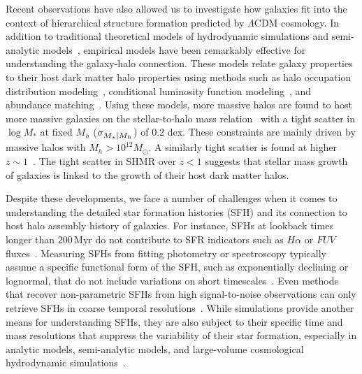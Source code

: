 \documentclass[12pt, letterpaper, preprint, tighten]{aastex62}
\newcommand{\siglogm}{\sigma_{\scaleto{M_*|M_h}{8pt}}}
\begin{document}
Recent observations have also allowed us to investigate how galaxies fit
into the context of hierarchical structure formation predicted by 
$\Lambda$CDM cosmology. In addition to traditional theoretical
models of hydrodynamic simulations and semi-analytic models~\citep[see][for reviews]{silk2012, somerville2015},
empirical models have been remarkably effective for understanding the 
galaxy-halo connection. These models relate galaxy properties to their 
host dark matter halo properties using methods such as halo occupation 
distribution modeling~\citep[HOD; \emph{e.g.}][]{zheng2007,zehavi2011,leauthaud2012,parejko2013,zu2015},
conditional luminosity function modeling~\citep[\emph{e.g.}][]{yang2009}, 
and abundance matching~\citep[\emph{e.g.}][]{kravtsov2004, vale2006, conroy2009, moster2013, reddick2013}.
Using these models, more massive halos are found to host more massive 
galaxies on the stellar-to-halo mass relation~\citep[hereafter SHMR;][]{mandelbaum2006a, conroy2007, more2011, leauthaud2012, tinker2013, velander2014, han2015, zu2015, gu2016, lange2018a} 
with a tight scatter in $\log M_*$ at fixed $M_h$ ($\siglogm$) of $0.2$ dex. 
These constraints are mainly driven by massive halos with $M_h > 10^{12} M_\odot$. 
A similarly tight scatter is found at higher $z\sim1$~\citep{leauthaud2012, tinker2013, patel2015}.
The tight scatter in SHMR over $z < 1$ suggests that stellar mass growth of 
galaxies is linked to the growth of their host dark matter halos.

Despite these developments, we face a number of challenges when it comes
to understanding the detailed star formation histories (SFH) and its
connection to host halo assembly history of galaxies.
For instance, SFHs at lookback times longer than $200\,\mathrm{Myr}$
do not contribute to SFR indicators such as $H\alpha$ or $FUV$ fluxes~\cite{sparre2017}.
Measuring SFHs from fitting photometry or spectroscopy typically
assume a specific functional form of the SFH, such as exponentially
declining or lognormal, that do not include variations on short
timescales~\citep[\emph{e.g.}][]{wilkinson2017, carnall2018}.
Even methods that recover non-parametric SFHs from high signal-to-noise
observations can only retrieve SFHs in coarse temporal resolutions~\citep[\emph{e.g.}][]{tojeiro2009, leja2018a}.
While simulations provide another means for understanding SFHs,
they are also subject to their specific time and mass resolutions that
suppress the variability of their star formation, especially in
analytic models, semi-analytic models, and large-volume cosmological
hydrodynamic simulations~\citep[][see also Figure~\ref{fig:illsfh}]{sparre2015, sparre2017}.
\end{document}
